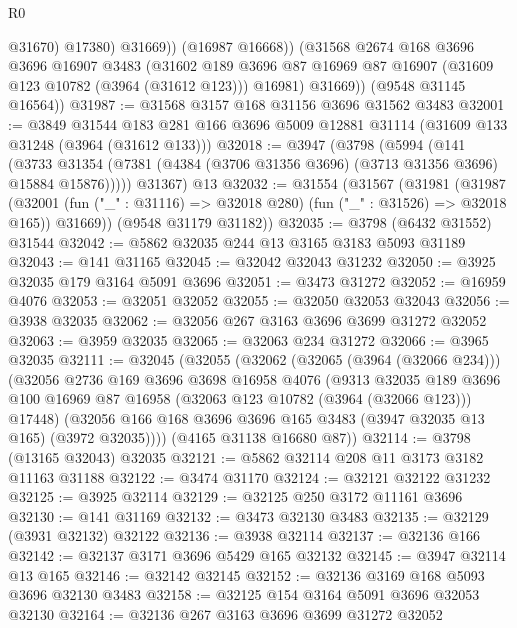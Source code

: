 \begin{lexlean}{R0}
\begin{coremodule}
                  @31670)
                @17380)
              @31669))
          (@16987 @16668))
        (@31568
          @2674
          @168
          @3696
          @3696
          @16907
          @3483
          (@31602
            @189
            @3696
            @87
            @16969
            @87
            @16907
            (@31609 @123 @10782 (@3964 (@31612 @123)))
            @16981)
          @31669))
      (@9548 @31145 @16564))
@31987 := @31568 @3157 @168 @31156 @3696 @31562 @3483
@32001 := @3849
    @31544
    @183
    @281
    @166
    @3696
    @5009
    @12881
    @31114
    (@31609 @133 @31248 (@3964 (@31612 @133)))
@32018 := @3947
    (@3798
      (@5994
        (@141
          (@3733 @31354 (@7381 (@4384 (@3706 @31356 @3696) (@3713 @31356 @3696) @15884 @15876)))))
      @31367)
    @13
@32032 := @31554
    (@31567
      (@31981
        (@31987
          (@32001 (fun ("_" : @31116) => @32018 @280) (fun ("_" : @31526) => @32018 @165))
          @31669))
      (@9548 @31179 @31182))
@32035 := @3798 (@6432 @31552) @31544
@32042 := @5862 @32035 @244 @13 @3165 @3183 @5093 @31189
@32043 := @141 @31165
@32045 := @32042 @32043 @31232
@32050 := @3925 @32035 @179 @3164 @5091 @3696
@32051 := @3473 @31272
@32052 := @16959 @4076
@32053 := @32051 @32052
@32055 := @32050 @32053 @32043
@32056 := @3938 @32035
@32062 := @32056 @267 @3163 @3696 @3699 @31272 @32052
@32063 := @3959 @32035
@32065 := @32063 @234 @31272
@32066 := @3965 @32035
@32111 := @32045
    (@32055
      (@32062
        (@32065 (@3964 (@32066 @234)))
        (@32056
          @2736
          @169
          @3696
          @3698
          @16958
          @4076
          (@9313
            @32035
            @189
            @3696
            @100
            @16969
            @87
            @16958
            (@32063 @123 @10782 (@3964 (@32066 @123)))
            @17448)
          (@32056 @166 @168 @3696 @3696 @165 @3483 (@3947 @32035 @13 @165) (@3972 @32035))))
      (@4165 @31138 @16680 @87))
@32114 := @3798 (@13165 @32043) @32035
@32121 := @5862 @32114 @208 @11 @3173 @3182 @11163 @31188
@32122 := @3474 @31170
@32124 := @32121 @32122 @31232
@32125 := @3925 @32114
@32129 := @32125 @250 @3172 @11161 @3696
@32130 := @141 @31169
@32132 := @3473 @32130 @3483
@32135 := @32129 (@3931 @32132) @32122
@32136 := @3938 @32114
@32137 := @32136 @166
@32142 := @32137 @3171 @3696 @5429 @165 @32132
@32145 := @3947 @32114 @13 @165
@32146 := @32142 @32145
@32152 := @32136 @3169 @168 @5093 @3696 @32130 @3483
@32158 := @32125 @154 @3164 @5091 @3696 @32053 @32130
@32164 := @32136 @267 @3163 @3696 @3699 @31272 @32052

\end{coremodule}
\end{lexlean}
